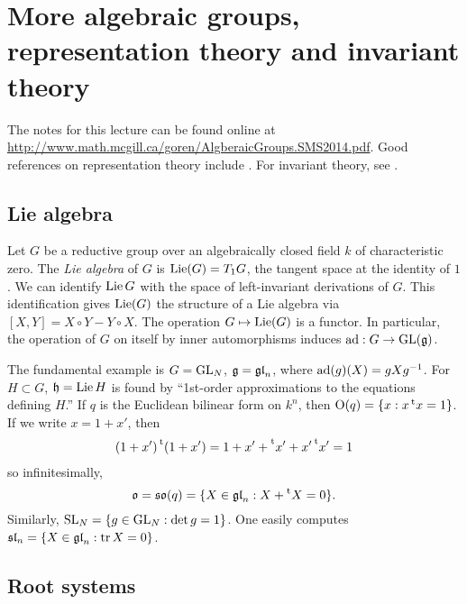 
\section{More algebraic groups, representation theory and invariant theory}





The notes for this lecture can be found online at 
\url{http://www.math.mcgill.ca/goren/AlgberaicGroups.SMS2014.pdf}. Good 
references on representation theory include \cite{h78,fh91}. For invariant 
theory, see \cite{mfk94,dc70,gw09}. 





\subsection{Lie algebra}

Let $G$ be a reductive group over an algebraically closed field $k$ of 
characteristic zero. The \emph{Lie algebra} of $G$ is 
$\operatorname{Lie}(G)=T_1 G$, the tangent space at the identity of $1$. We can identify 
$\operatorname{Lie} G$ with the space of left-invariant derivations of $G$. This 
identification gives $\operatorname{Lie}(G)$ the structure of a Lie algebra via 
$[X,Y]=X\circ Y-Y\circ X$. The operation $G\mapsto \operatorname{Lie}(G)$ is a 
functor. In particular, the operation of $G$ on itself by inner 
automorphisms induces $\operatorname{ad}:G\to \operatorname{GL}(\mathfrak{g})$. 

The fundamental example is $G=\operatorname{GL}_N$, 
$\mathfrak{g}=\mathfrak{gl}_n$, where $\operatorname{ad}(g)(X)=g X g^{-1}$. For 
$H\subset G$, $\mathfrak{h}=\operatorname{Lie} H$ is found by ``1st-order approximations to the 
equations defining $H$.'' If $q$ is the Euclidean bilinear form on 
$k^n$, then $\operatorname{O}(q) = \{x:x \prescript{\mathrm{t}}{}{x}=1\}$. If we write 
$x=1+x '$, then 
\[
  (1+x') \prescript{\mathrm{t}}{}{(}1+x') = 1+x' + \prescript{\mathrm{t}}{}{x'} + x' \prescript{\mathrm{t}}{}{x'} = 1
\]
so infinitesimally, 
\[
  \mathfrak o = \mathfrak{so}(q) = \{X\in \mathfrak{gl}_n:X+\prescript{\mathrm{t}}{}{X}=0\} .
\]
Similarly, $\operatorname{SL}_N=\{g\in \operatorname{GL}_N:\det g=1\}$. One easily 
computes $\mathfrak{sl}_n = \{X\in \mathfrak{gl}_n:\operatorname{tr} X=0\}$. 





\subsection{Root systems}

